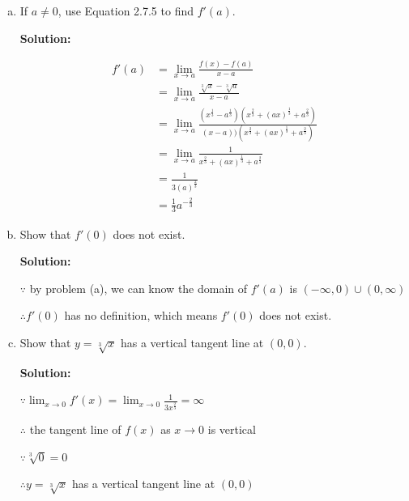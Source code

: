 \documentclass{article}
\newenvironment{solution}{
    \par \textbf{Solution: } \quad \par
}{\par}
\begin{document}
    \begin{enumerate}[(a)]
        \item If $a \not = 0$, use Equation 2.7.5 to find $f'(a)$.

        \begin{solution}
            $$
            \begin{aligned}
                f'(a) &= \lim_{x \to a}\frac{f(x) - f(a)}{x - a} \\
                &= \lim_{x \to a}\frac{\sqrt[3]x - \sqrt[3]a}{x - a} \\
                &= \lim_{x \to a}\frac{(x^{\frac 1 3} - a^{\frac 1 3})(x^{\frac 2 3} + (ax)^{\frac 1 3} + a^{\frac 2 3})}{(x - a))(x^{\frac 2 3} + (ax)^{\frac 1 3} + a^{\frac 2 3})} \\
                &= \lim_{x \to a}\frac{1}{x^{\frac 2 3} + (ax)^{\frac 1 3} + a^{\frac 2 3}} \\
                &= \frac{1}{3(a)^{\frac 2 3}} \\
                &= \frac 1 3 a^{-\frac 2 3}
            \end{aligned}
            $$
        \end{solution}

        \item Show that $f'(0)$ does not exist.

        \begin{solution}
            $\because $ by problem (a), we can know the domain of $f'(a)$ is $(-\infty, 0) \cup (0, \infty)$
            
            $\therefore f'(0)$ has no definition, which means $f'(0)$ does not exist.
        \end{solution}

        \item Show that $y = \sqrt[3]x$ has a vertical tangent line at $(0,0)$.

        \begin{solution}
            $\because \lim_{x \to 0}f'(x) = \lim_{x \to 0}\frac{1}{3x^{\frac 2 3}} = \infty$

            $\therefore$ the tangent line of $f(x)$ as $x \to 0$ is vertical
            
            $\because \sqrt[3]0 = 0$

            $\therefore y = \sqrt[3]x$ has a vertical tangent line at $(0,0)$
        \end{solution}
    \end{enumerate}
\end{document}
